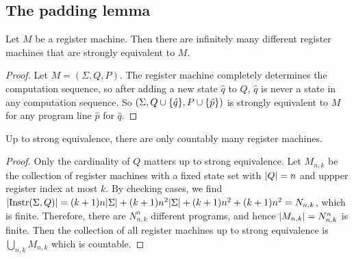 \subsection{The padding lemma}
\begin{proposition}
	Let \( M \) be a register machine.
	Then there are infinitely many different register machines that are strongly equivalent to \( M \).
\end{proposition}
\begin{proof}
	Let \( M = (\Sigma, Q, P) \).
	The register machine completely determines the computation sequence, so after adding a new state \( \hat q \) to \( Q \), \( \hat q \) is never a state in any computation sequence.
	So \( (\Sigma, Q \cup \qty{\hat q}, P \cup \qty{\hat p}) \) is strongly equivalent to \( M \) for any program line \( \hat p \) for \( \hat q \).
\end{proof}
\begin{proposition}
	Up to strong equivalence, there are only countably many register machines.
\end{proposition}
\begin{proof}
	Only the cardinality of \( Q \) matters up to strong equivalence.
	Let \( M_{n,k} \) be the collection of register machines with a fixed state set with \( \abs{Q} = n \) and uppper register index at most \( k \).
	By checking cases, we find \( \abs{\operatorname{Instr}(\Sigma,Q)} = (k+1)n\abs{\Sigma} + (k+1)n^2\abs{\Sigma} + (k+1)n^2 + (k+1)n^2 = N_{n,k} \), which is finite.
	Therefore, there are \( N_{n,k}^n \) different programs, and hence \( \abs{M_{n,k}} = N_{n,k}^n \) is finite.
	Then the collection of all register machines up to strong equivalence is \( \bigcup_{n,k} M_{n,k} \) which is countable.
\end{proof}

